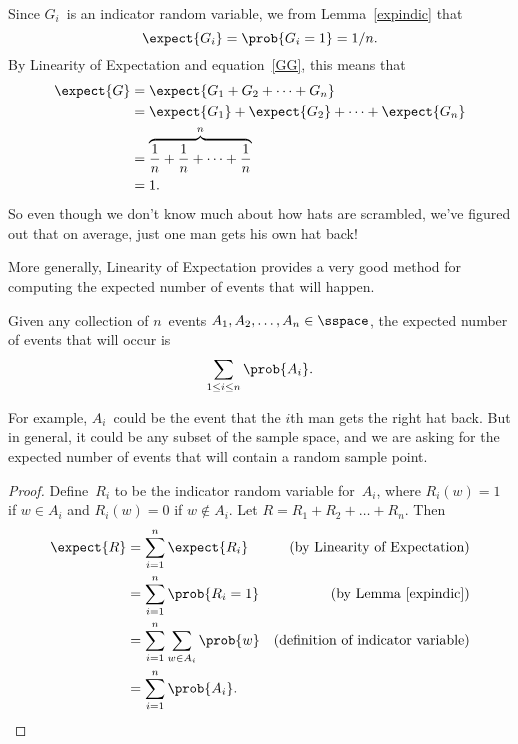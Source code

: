 Since $G_i$~is an indicator random variable, we from
Lemma~\ref{expindic} that
\begin{equation}
    \expect{G_i}= \prob{G_i=1} = 1/n.
\end{equation} 
By Linearity of Expectation and equation~\ref{GG}, this means that
\begin{align*}
\expect{G} & = \expect{G_1 + G_2 + \cdots + G_n} \\
       & = \expect{G_1} + \expect{G_2} + \cdots + \expect{G_n}\\
       & = \overbrace{\frac{1}{n} + \frac{1}{n} + \cdots + \frac{1}{n}}^n \\
       &= 1.
\end{align*}
So even though we don't know much about how hats are scrambled, we've
figured out that on average, just one man gets his own hat back!

More generally, Linearity of Expectation provides a very good method
for computing the expected number of events that will happen.

\begin{theorem}\label{thm:17T3}
Given any collection of $n$~events $A_1, A_2, \dots, A_n \in \sspace$,
the expected number of events that will occur is
\begin{equation*}
    \sum_{1 \le i \le n} \prob{A_i}.
\end{equation*}
\end{theorem}

For example, $A_i$~could be the event that the $i$th man gets the
right hat back.  But in general, it could be any subset of the sample
space, and we are asking for the expected number of events that will
contain a random sample point.

\begin{proof}

Define~$R_i$ to be the indicator random variable for~$A_i$, where
$R_i(w) = 1$ if $w \in A_i$ and $R_i(w) = 0$ if $w \notin A_i$.  Let
$R = R_1 + R_2 + \dots + R_n$.  Then
\begin{align*}
\expect{R}
    &= \sum_{i = 1}^n \expect{R_i}
    & \text{(by Linearity of Expectation)}\\
%
    &= \sum_{i = 1}^n \prob{R_i = 1}
    & \text{(by Lemma \ref{expindic})}\\
%
    &= \sum_{i = 1}^n \sum_{w \in A_i} \prob{w}
    & \text{(definition of indicator variable)}\\
%
    &= \sum_{i = 1}^n \prob{A_i}. & \qedhere
\end{align*}
\end{proof}

